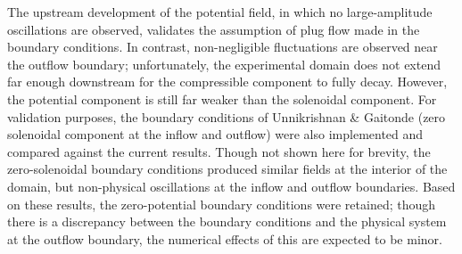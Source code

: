 The upstream development of the potential field, in which no large-amplitude oscillations are observed, validates the assumption of plug flow made in the boundary conditions.
In contrast, non-negligible fluctuations are observed near the outflow boundary; unfortunately, the experimental domain does not extend far enough downstream for the compressible component to fully decay.
However, the potential component is still far weaker than the solenoidal component.
For validation purposes, the boundary conditions of Unnikrishnan \& Gaitonde \citep{Unnikrishnan2015} (zero solenoidal component at the inflow and outflow) were also implemented and compared against the current results.
Though not shown here for brevity, the zero-solenoidal boundary conditions produced similar fields at the interior of the domain, but non-physical oscillations at the inflow and outflow boundaries.
Based on these results, the zero-potential boundary conditions were retained; though there is a discrepancy between the boundary conditions and the physical system at the outflow boundary, the numerical effects of this are expected to be minor.
